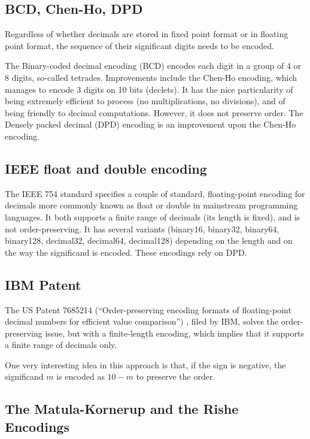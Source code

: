 \documentclass{acm_proc_article-sp}
\begin{document}
\subsection{BCD, Chen-Ho, DPD}

Regardless of whether decimals are stored in fixed point format or in floating point format, the sequence of their significant digits needs to be encoded.

The Binary-coded decimal encoding (BCD) encodes each digit in a group of 4 or 8 digits, so-called tetrades. Improvements include the Chen-Ho \cite{ChenHo} encoding, which manages to encode 3 digits on 10 bits (declets). It has the nice particularity of being extremely efficient to process (no multiplications, no divisions), and of being friendly to decimal computations. However, it does not preserve order. The Densely packed decimal (DPD) encoding \cite{DPD} is an improvement upon the Chen-Ho encoding.

\subsection{IEEE float and double encoding}

The IEEE 754 standard specifies a couple of standard, floating-point encoding for decimals more commonly known as float or double in mainstream programming languages. It both supports a finite range of decimals (its length is fixed), and is not order-preserving. It has several variants (binary16, binary32, binary64, binary128, decimal32, decimal64, decimal128) depending on the length and on the way the significand is encoded. These encodings rely on DPD.

\subsection{IBM Patent}
The US Patent 7685214 (``Order-preserving encoding formats of floating-point decimal numbers for efficient value comparison'') , filed by IBM, solves the order-preserving issue, but with a finite-length encoding, which implies that it supports a finite range of decimals only.

One very interesting idea in this approach is that, if the sign is negative, the significand $m$ is encoded as $10-m$ to preserve the order.

\subsection{The Matula-Kornerup and the Rishe Encodings}
\label{section-rishe}
\end{document}
